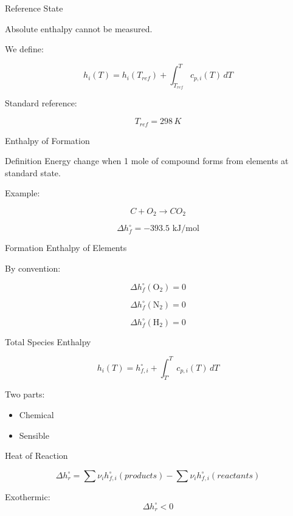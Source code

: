 \documentclass[aspectratio=169]{beamer}
\begin{document}
\begin{frame}{Reference State}

Absolute enthalpy cannot be measured.

We define:

\[
h_i(T) = h_i(T_{ref}) + \int_{T_{ref}}^T c_{p,i}(T)\, dT
\]

Standard reference:

\[
T_{ref} = 298\,K
\]

\end{frame}

\begin{frame}{Enthalpy of Formation}

\begin{block}{Definition}
Energy change when 1 mole of compound forms from elements at standard state.
\end{block}

Example:

\[
C + O_2 \rightarrow CO_2
\]

\[
\Delta h_f^\circ = -393.5 \text{ kJ/mol}
\]

\end{frame}

\begin{frame}{Formation Enthalpy of Elements}

By convention:

\[
\Delta h_f^\circ(\text{O}_2) = 0
\]

\[
\Delta h_f^\circ(\text{N}_2) = 0
\]

\[
\Delta h_f^\circ(\text{H}_2) = 0
\]

\end{frame}

\begin{frame}{Total Species Enthalpy}

\[
h_i(T) = h_{f,i}^\circ + \int_{T^\circ}^{T} c_{p,i}(T)\, dT
\]

\pause

Two parts:
\begin{itemize}
  \item Chemical
  \item Sensible
\end{itemize}

\end{frame}

\begin{frame}{Heat of Reaction}

\[
\Delta h_r^\circ = 
\sum \nu_i h_{f,i}^\circ (products)
-
\sum \nu_i h_{f,i}^\circ (reactants)
\]

\pause

Exothermic:
\[
\Delta h_r^\circ < 0
\]

\end{frame}
\end{document}
